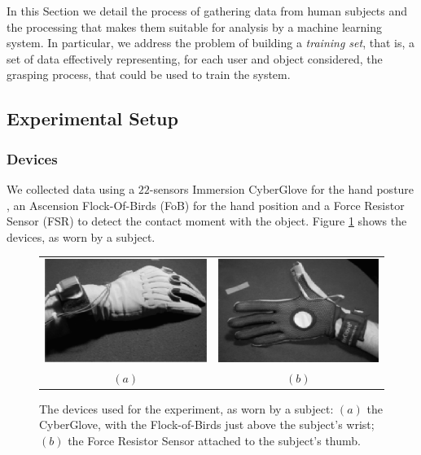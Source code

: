 In this Section we detail the process of gathering data from human
subjects and the processing that makes them suitable for
analysis by a machine learning system. In particular, we address the
problem of building a \emph{training set}, that is, a set of data
effectively representing, for each user and object considered, the
grasping process, that could be used to train the system.

\subsection{Experimental Setup}

\subsubsection*{Devices}

We collected data using a $22$-sensors Immersion CyberGlove for the
hand posture \cite{cyberglove}, an Ascension Flock-Of-Birds (FoB) for
the hand position \cite{fob} and a Force Resistor Sensor (FSR) to
detect the contact moment with the object. Figure \ref{fig:devices}
shows the devices, as worn by a subject.

\begin{figure}[htbp]
  \begin{center}
    \begin{tabular}{cc}
      \includegraphics[width=0.45\linewidth]{devices1.eps} &
      \includegraphics[width=0.45\linewidth]{devices2.eps} \\
      $(a)$ & $(b)$
    \end{tabular}
    \caption{The devices used for the experiment, as worn by a
    subject: $(a)$ the CyberGlove, with the Flock-of-Birds just above
    the subject's wrist; $(b)$ the Force Resistor Sensor attached to
    the subject's thumb.}
    \label{fig:devices}
  \end{center}
\end{figure}

